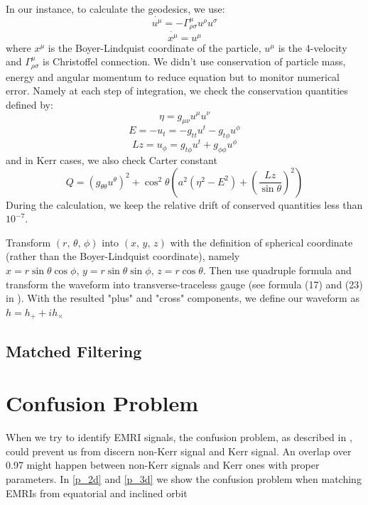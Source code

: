 \documentclass{article}
\begin{document}
In our instance, to calculate the geodesics, we use:
\begin{equation}
	\dot{u^\mu}=-\Gamma^\mu_{\rho\sigma}u^\rho u^\sigma
\end{equation}
\begin{equation}
	\dot{x^\mu}=u^\mu 
\end{equation}
where $x^\mu$ is the Boyer-Lindquist coordinate of the particle, $u^\mu$ is the 4-velocity and $\Gamma^\mu_{\rho\sigma}$ is Christoffel connection. We didn't use conservation of particle mass, energy and angular momentum to reduce equation but to monitor numerical error. Namely at each step of integration, we check the conservation quantities defined by:
\begin{equation}
	\eta = g_{\mu\nu} u^\mu u^\nu
\end{equation}
\begin{equation}
	E = -u_t = - g_{tt} u^t -g_{t\phi} u^\phi
\end{equation}
\begin{equation}
	Lz = u_\phi = g_{t\phi } u^t + g_{\phi\phi} u^\phi
\end{equation}
 and in Kerr cases, we also check Carter constant
 \begin{equation}
 	Q = (g_{\theta\theta} u^\theta)^2 + \cos ^2 \theta (a^2 (\eta^2-E^2) + (\frac{Lz}{\sin \theta})^2 )
 \end{equation}
During the calculation, we keep the relative drift of conserved quantities less than $10^{-7}$.

Transform $(r,\,\theta,\,\phi)$ into $(x,\,y,\,z)$ with the definition of spherical coordinate (rather than the Boyer-Lindquist coordinate), namely $x=r\sin\theta \cos \phi,\, y=r\sin\theta\sin\phi,\, z=r\cos\theta$. Then use quadruple formula and transform the waveform into transverse-traceless gauge (see formula (17) and (23) in \cite{kludge}). With the resulted "plus" and "cross" components, we define our waveform as $h = h_+ + i h_\times$
\subsection{Matched Filtering}
\label{p_mf}
\section{Confusion Problem}
When we try to identify EMRI signals, the confusion problem, as described in \cite{sameOmg}, could prevent us from discern non-Kerr signal and Kerr signal. An overlap over 0.97 might happen between non-Kerr signals and Kerr ones with proper parameters. In \ref{p_2d} and \ref{p_3d} we show the confusion problem when matching EMRIs from equatorial and inclined orbit 
\end{document}
